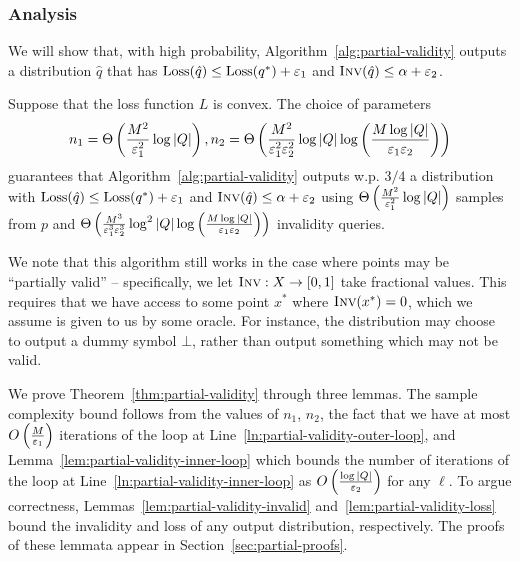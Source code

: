 \subsubsection{Analysis}
We will show that, with high probability, Algorithm~\ref{alg:partial-validity} outputs a distribution $\hat q$ that has $\text{Loss}(\hat q) \leq \text{Loss}(q^*) + \varepsilon_1$ and $\textsc{Inv}(\hat q) \leq \alpha + \varepsilon_2$.

\begin{theorem}\label{thm:partial-validity}
  Suppose that the loss function $L$ is convex.
  The choice of parameters
  \begin{equation}
  n_1 = \Theta\left(\frac{M^2}{\varepsilon_1^2} \log |Q| \right), n_2 = \Theta\left(\frac {M^2} {\varepsilon_1^2 \varepsilon_2^2} \log |Q| \log \left(\frac{M \log |Q|}{\varepsilon_1 \varepsilon_2}\right)\right)
  \end{equation}
  guarantees that Algorithm~\ref{alg:partial-validity} outputs w.p. $3/4$ a distribution with $\text{Loss}(\hat q) \le \text{Loss}(q^*) + \varepsilon_1$ and $\textsc{Inv}(\hat q) \le \alpha + \varepsilon_2$ using $\Theta\left(\frac{M^2}{\varepsilon_1^2} \log |Q| \right)$ samples from $p$ and $\Theta\left(\frac{M^3}{ \varepsilon_1^3 \varepsilon_2^3} \log^2 |Q| \log \left(\frac{M \log |Q|}{\varepsilon_1\varepsilon_2}\right)\right)$ invalidity queries.
\end{theorem}

\begin{remark}
We note that this algorithm still works in the case where points may be ``partially valid'' -- specifically, we let $\textsc{Inv}: X \rightarrow [0,1]$ take fractional values.
This requires that we have access to some point $x^*$ where $\textsc{Inv}(x^*) = 0$, which we assume is given to us by some oracle.
For instance, the distribution may choose to output a dummy symbol $\bot$, rather than output something which may not be valid. 
\end{remark}

We prove Theorem~\ref{thm:partial-validity} through three lemmas.
The sample complexity bound follows from the values of $n_1$, $n_2$, the fact that we have at most $O\left(\frac{M}{\varepsilon_1}\right)$ iterations of the loop at Line~\ref{ln:partial-validity-outer-loop}, and Lemma~\ref{lem:partial-validity-inner-loop} which bounds the number of iterations of the loop at Line~\ref{ln:partial-validity-inner-loop} as $O\left(\frac{\log |Q|}{\varepsilon_2}\right)$ for any $\ell$.
To argue correctness, Lemmas~\ref{lem:partial-validity-invalid} and~\ref{lem:partial-validity-loss} bound the invalidity and loss of any output distribution, respectively.
The proofs of these lemmata appear in Section~\ref{sec:partial-proofs}.

